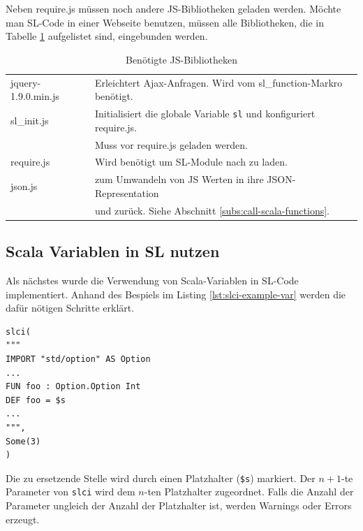 \documentclass[12pt]{scrreprt}
\begin{document}
Neben require.js müssen noch andere \ac{JS}-Bibliotheken geladen werden. Möchte man \ac{SL}-Code in einer Webseite benutzen, müssen alle Bibliotheken, die in Tabelle \ref{tab:js-libraries} aufgelistet sind, eingebunden werden.

\begin{table}[h]
\caption{Benötigte \ac{JS}-Bibliotheken}
\centering
\begin{tabular}{ll}
jquery-1.9.0.min.js & Erleichtert Ajax-Anfragen. Wird vom sl\_function-Markro benötigt.\\
sl\_init.js         & Initialisiert die globale Variable \lstinline!sl! und konfiguriert require.js. \\
                    & Muss vor require.js geladen werden.\\
require.js          & Wird benötigt um \ac{SL}-Module nach zu laden.\\
json.js             & zum Umwandeln von JS Werten in ihre JSON-Representation \\
                    & und zurück. Siehe Abschnitt \ref{subs:call-scala-functions}.\\
\end{tabular}
\label{tab:js-libraries}
\end{table}

\subsection{Scala Variablen in SL nutzen}

Als nächstes wurde die Verwendung von Scala-Variablen in \ac{SL}-Code implementiert. Anhand des Bespiels im Listing \ref{lst:slci-example-var} werden die dafür nötigen Schritte erklärt.

\begin{lstlisting}[caption={Beispielaufruf des slci Macros mit Scala Variablen}, label=lst:slci-example-var, float=h]
slci(
"""
IMPORT "std/option" AS Option 
...
FUN foo : Option.Option Int
DEF foo = $s
...
""",
Some(3)
)
\end{lstlisting}

Die zu ersetzende Stelle wird durch einen Platzhalter (\lstinline!$s!) markiert. Der $n+1$-te Parameter von \lstinline!slci! wird dem $n$-ten Platzhalter zugeordnet. Falls die Anzahl der Parameter ungleich der Anzahl der Platzhalter ist, werden Warnings oder Errors erzeugt. 
\end{document}
